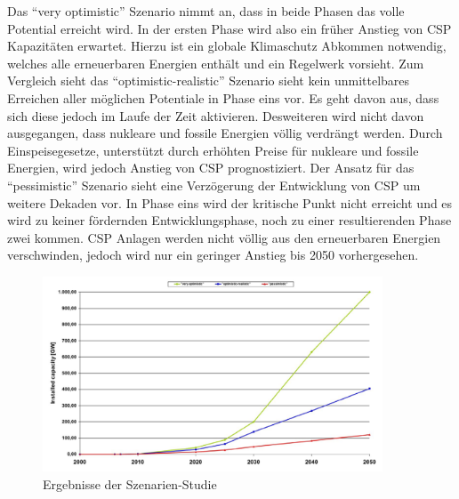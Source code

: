Das "`very optimistic"' Szenario nimmt an, dass in beide Phasen das volle Potential erreicht wird. In der ersten Phase wird also ein früher Anstieg von CSP Kapazitäten erwartet. Hierzu ist ein globale Klimaschutz Abkommen notwendig, welches alle erneuerbaren Energien enthält und ein Regelwerk vorsieht.
Zum Vergleich sieht das "`optimistic-realistic"' Szenario sieht kein unmittelbares Erreichen aller möglichen Potentiale in Phase eins vor. Es geht davon aus, dass sich diese jedoch im Laufe der Zeit aktivieren. Desweiteren wird nicht davon ausgegangen, dass nukleare und fossile Energien völlig verdrängt werden. Durch Einspeisegesetze, unterstützt durch erhöhten Preise für nukleare und fossile Energien, wird jedoch Anstieg von CSP prognostiziert.
Der Ansatz für das "`pessimistic"' Szenario sieht eine Verzögerung der Entwicklung von CSP um weitere Dekaden vor. In Phase eins wird der kritische Punkt nicht erreicht und es wird zu keiner fördernden Entwicklungsphase, noch zu einer resultierenden Phase zwei kommen. CSP Anlagen werden nicht völlig aus den erneuerbaren Energien verschwinden, jedoch wird nur ein geringer Anstieg bis 2050 vorhergesehen.


\begin{figure}[H]
	\centering
	\includegraphics[width=0.9\textwidth,trim=1 1 1 1,clip]{szenarien.png}
	\caption{Ergebnisse der Szenarien-Studie}
	\label{fig:scenes}
\end{figure}


